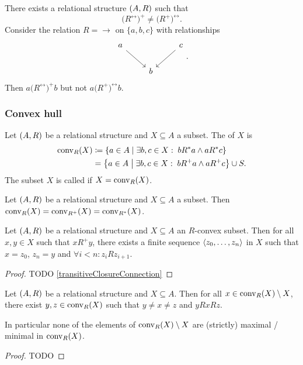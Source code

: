 \begin{example}
There exists a relational structure $\left( A,R \right)$ such that
\[ \big(R^\leftrightarrow\big)^+ \neq \big(R^+\big)^\leftrightarrow. \]
Consider the relation $R = {\to}$ on $\{a,b,c\}$ with relationships
\[ \begin{tikzcd}
a \ar[dr] & {} & \ar[dl] c \\
{} & b & {}
\end{tikzcd}. \]
Then $a \mathrel{\big(R^\leftrightarrow\big)^+}b$ but not $a \mathrel{\big(R^+\big)^\leftrightarrow}b$.
\end{example}



\subsubsection{Convex hull}
\begin{definition}
Let $\left( A,R \right)$ be a relational structure and $X\subseteq A$ a subset. The  of $X$ is
\begin{align*}
\operatorname{conv}_R(X) &\coloneqq \left\{ a\in A \;\middle|\; \exists b,c\in X:\; bR^*a \land aR^*c \right\} \\
&= \left\{ a\in A \;\middle|\; \exists b,c\in X:\; bR^+a \land aR^+c \right\} \cup S.
\end{align*}
The subset $X$ is called  if $X = \operatorname{conv}_R(X)$.
\end{definition}

\begin{lemma}
Let $\left( A,R \right)$ be a relational structure and $X\subseteq A$ a subset. Then $\operatorname{conv}_R(X) = \operatorname{conv}_{R^+}(X) = \operatorname{conv}_{R^*}(X)$.
\end{lemma}

\begin{lemma} \label{transitiveClosureConnectionInSet}
Let $\left( A,R \right)$ be a relational structure and $X\subseteq A$ an $R$-convex subset. Then for all $x,y\in X$ such that $x\mathrel{R^+}y$, there exists a finite sequence $\left\langle z_0, \ldots, z_n \right\rangle$ in $X$ such that $x = z_0$, $z_n = y$ and $\forall i<n: z_iRz_{i+1}$.
\end{lemma}
\begin{proof}
TODO \ref{transitiveClosureConnection}
\end{proof}

\begin{lemma} \label{addedElementsRConvexHull}
Let $\left( A,R \right)$ be a relational structure and $X\subseteq A$. Then for all $x\in \operatorname{conv}_R(X)\setminus X$, there exist $y,z\in \operatorname{conv}_R(X)$ such that $y\neq x\neq z$  and $yRxRz$.

In particular none of the elements of $\operatorname{conv}_R(X)\setminus X$ are (strictly) maximal / minimal in $\operatorname{conv}_R(X)$.
\end{lemma}
\begin{proof}
TODO
\end{proof}

